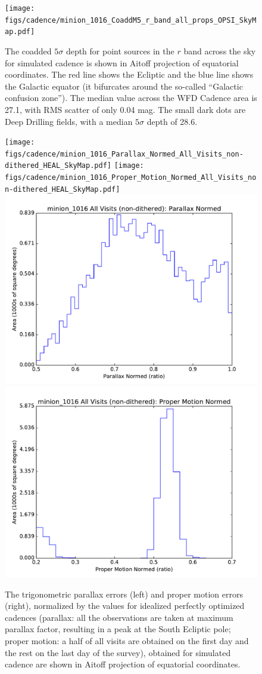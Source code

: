\begin{figure}[t!]
\vskip -0.1in
\texttt{[image: figs/cadence/minion\_1016\_CoaddM5\_r\_band\_all\_props\_OPSI\_SkyMap.pdf]}
\vskip -0.5in
\caption{The coadded $5\sigma$ depth for point sources in the $r$ band
across the sky for simulated cadence  is shown
in Aitoff projection of equatorial coordinates. The red line shows the Ecliptic and
the blue line shows the Galactic equator (it bifurcates around the so-called
``Galactic confusion zone''). The median value across the WFD Cadence area
is 27.1, with RMS scatter of only 0.04 mag. The small dark dots are Deep Drilling
fields, with a median $5\sigma$ depth of 28.6.}
\label{fig:coaddm5enigma}
\end{figure}

\begin{figure}[t!]
\vskip -0.0in
\texttt{[image: figs/cadence/minion\_1016\_Parallax\_Normed\_All\_Visits\_non-dithered\_HEAL\_SkyMap.pdf]}
\texttt{[image: figs/cadence/minion\_1016\_Proper\_Motion\_Normed\_All\_Visits\_non-dithered\_HEAL\_SkyMap.pdf]}
\includegraphics[angle=0,width=0.49\hsize,clip]{figs/cadence/minion_1016_Parallax_Normed_All_Visits_non-dithered_HEAL_Histogram.pdf}
\includegraphics[angle=0,width=0.49\hsize,clip]{figs/cadence/minion_1016_Proper_Motion_Normed_All_Visits_non-dithered_HEAL_Histogram.pdf}
\vskip -0.1in
\caption{The trigonometric parallax errors (left) and proper motion errors (right), normalized
by the values for idealized perfectly optimized cadences (parallax: all the observations are taken
at maximum parallax factor, resulting in a peak at the South Ecliptic pole; proper motion:
a half of all visits are obtained on the first day and the rest on the last day of the survey),
obtained for simulated cadence  are shown in Aitoff projection of equatorial
coordinates.}
\label{fig:parapmenigma}
\end{figure}


